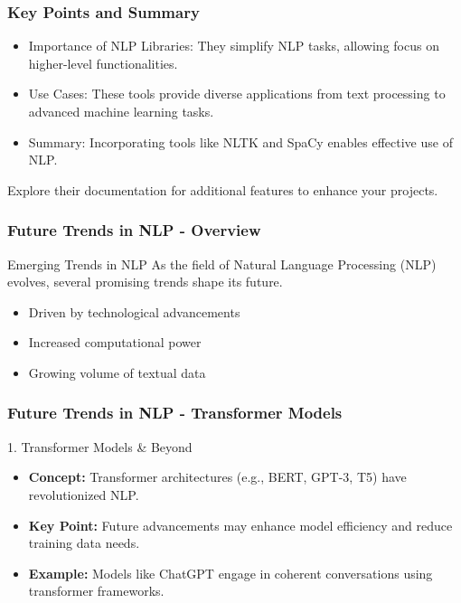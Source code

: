 \documentclass{beamer}
\begin{document}
\begin{frame}[fragile]
    \frametitle{Key Points and Summary}
    \begin{itemize}
        \item Importance of NLP Libraries: They simplify NLP tasks, allowing focus on higher-level functionalities.
        \item Use Cases: These tools provide diverse applications from text processing to advanced machine learning tasks.
        \item Summary: Incorporating tools like NLTK and SpaCy enables effective use of NLP.
    \end{itemize}
    Explore their documentation for additional features to enhance your projects.
\end{frame}

\begin{frame}[fragile]
    \frametitle{Future Trends in NLP - Overview}
    \begin{block}{Emerging Trends in NLP}
        As the field of Natural Language Processing (NLP) evolves, several promising trends shape its future. 
    \end{block}
    
    \begin{itemize}
        \item Driven by technological advancements
        \item Increased computational power
        \item Growing volume of textual data
    \end{itemize}
\end{frame}

\begin{frame}[fragile]
    \frametitle{Future Trends in NLP - Transformer Models}
    \begin{block}{1. Transformer Models \& Beyond}
        \begin{itemize}
            \item \textbf{Concept:} Transformer architectures (e.g., BERT, GPT-3, T5) have revolutionized NLP.
            \item \textbf{Key Point:} Future advancements may enhance model efficiency and reduce training data needs.
            \item \textbf{Example:} Models like ChatGPT engage in coherent conversations using transformer frameworks.
        \end{itemize}
    \end{block}
\end{frame}
\end{document}
